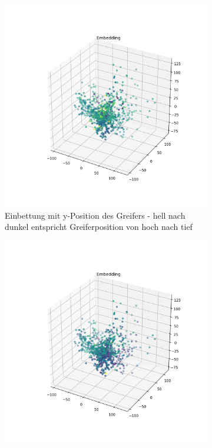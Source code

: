 	  \begin{figure}[h]
		\centering
		\begin{subfigure}[c]{0.49\textwidth}			
			\includegraphics[width=1\textwidth,center]{bilder/Hauptteil/Autoencoder_Grappel_Detection/Embedding_y.png}
			\caption{Einbettung mit y-Position des Greifers - hell nach dunkel entspricht Greiferposition von hoch nach tief}
			\label{img:Emb_y_AE}	
		\end{subfigure}
		\begin{subfigure}[c]{0.49\textwidth}			
			\includegraphics[width=1\textwidth, center]{bilder/Hauptteil/Autoencoder_Grappel_Detection/Embedding_x.png}

\end{subfigure}
\end{figure}
